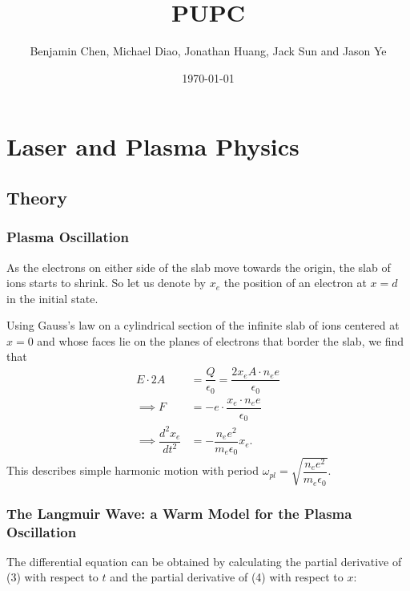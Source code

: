 \documentclass{paper}
\begin{document}
\setcounter{page}{-1}

\setlength{\parindent}{0pt}

\title{PUPC}
\author{Benjamin Chen, Michael Diao, Jonathan Huang, Jack Sun and Jason Ye}
\date{\today}
\maketitle

\tableofcontents
\fancyfoot{}

\newpage

\chapter{Laser and Plasma Physics}

\setcounter{section}{1}
\section{Theory}
\subsection{Plasma Oscillation}

As the electrons on either side of the slab move towards the origin, the slab of ions starts to shrink. So let us denote by $x_e$ the position of an electron at $x = d$ in the initial state.

Using Gauss's law on a cylindrical section of the infinite slab of ions centered at $x=0$ and whose faces lie on the planes of electrons that border the slab, we find that
\begin{align*}
    E\cdot 2A &= \dfrac{Q}{\epsilon_0}
    = \dfrac{2x_eA \cdot n_ee}{\epsilon_0}\\
    \implies 
    F &= -e \cdot \dfrac{x_e \cdot n_ee}{\epsilon_0}\\
    \implies 
    \dfrac{d^2x_e}{dt^2} &= -\dfrac{n_ee^2}{m_e\epsilon_0}x_e.
\end{align*}
This describes simple harmonic motion with period $\omega_{pl} = \sqrt{\dfrac{n_ee^2}{m_e\epsilon_0}}$.

\subsection{The Langmuir Wave: a Warm Model for the Plasma Oscillation}

    The differential equation can be obtained by calculating the partial derivative of (3) with respect to $t$ and the partial derivative of (4) with respect to $x$:
\end{document}
